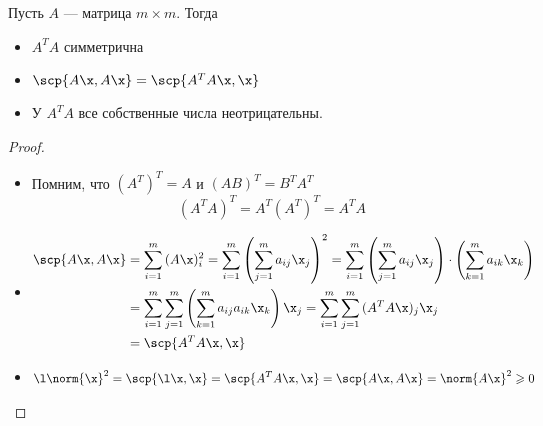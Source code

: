 \begin{lemma}
    Пусть $A$ --- матрица $m \times m$. Тогда
\begin{itemize}
    \item $A^T A$ симметрична
    \item $\scp{A\x, A\x} = \scp{A^T A \x, \x}$
    \item У $A^T A$ все собственные числа неотрицательны.
\end{itemize}
\end{lemma}
\begin{proof}
    \enewline

    \begin{itemize}
        \item Помним, что $(A^T)^T = A$ и $(AB)^T = B^T A^T$
\[
    (A^T A)^T = A^T (A^T)^T = A^T A
\]
        \item
\begin{align*}
    \scp{A \x, A \x} &= \sum_{i = 1}^{m}{(A\x)_i^2}
    = \sum_{i = 1}^{m}{\left(\sum_{j = 1}^{m}{a_{ij} \x_j}\right)^2}
    = \sum_{i = 1}^{m}{\left(\sum_{j = 1}^{m}{a_{ij} \x_j} \right)
    \cdot \left(\sum_{k = 1}^{m}{a_{ik} \x_k}\right)} \\
    &= \sum_{i = 1}^{m}{\sum_{j = 1}^{m}{\left(\sum_{k = 1}^{m}{a_{ij} a_{ik} \x_k}
    \right) \x_j}} = \sum_{i = 1}^{m}{\sum_{j = 1}^{m}{(A^T A \x)_j} \x_j} \\
    &= \scp{A^T A \x, \x}
\end{align*}
        \item
\begin{align*}
    \l \norm{\x}^2 = \scp{\l \x, \x} = \scp{A^T A \x, \x} =
    \scp{A\x, A\x} = \norm{A\x}^2 \geqslant 0
\end{align*}
    \end{itemize}
\end{proof}

